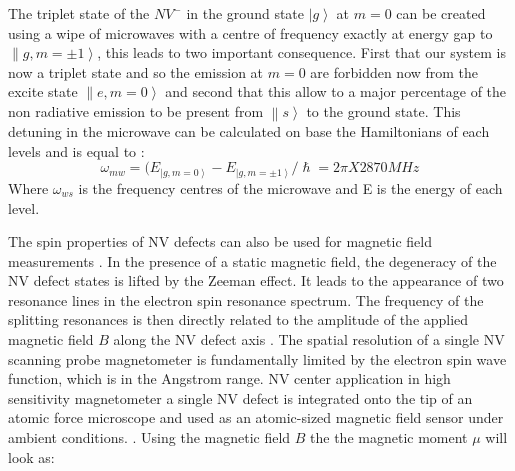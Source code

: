 The triplet state of the  $NV^{-}$ in the ground state $\left| g \right\rangle $ at $m=0$ can be created using a wipe of microwaves with a centre of frequency exactly at energy gap to $\left\| g,m=\pm1\right\rangle $, this leads to two important consequence. First that our system is now a triplet state and so the emission at $m=0$ are forbidden now from the excite state $\left\| e,m=0\right\rangle $ and second that this allow to a major percentage of the non radiative emission to be present from $\left\| s\right\rangle $ to the ground state. This detuning in the microwave can be calculated on base the Hamiltonians of each levels and is equal to \cite{schirhagl_nitrogen-vacancy_2014}:\\

\begin{equation}
\omega_{mw}=(E_{\left|g,m=0\right\rangle}-E_{\left|g,m=\pm 1\right\rangle}/ \hslash = 2π X 2870MHz 
\end{equation}
Where $\omega_{ws}$ is the frequency centres of the microwave and E is the energy of each level.

The spin properties of NV defects can also be used for magnetic field measurements \cite{sage_optical_2013}. In the presence of a static magnetic field, the degeneracy of the NV defect states is lifted by the Zeeman effect.  It leads to the appearance of two resonance lines in the electron spin resonance spectrum. The frequency of the splitting resonances is then directly related to the amplitude of the applied magnetic field $B$ along the NV defect axis  \cite{lesik_engineering_2015}. The spatial resolution of a single NV scanning probe magnetometer is fundamentally limited by the electron spin wave function, which is in the Angstrom range. NV center application in high sensitivity magnetometer a single NV defect is integrated onto the tip of an atomic force microscope and used as an atomic-sized magnetic ﬁeld sensor under ambient conditions. \cite{zhou_scanning_2017}.
Using the magnetic field $B$ the the magnetic moment $\mu$ will look as:\\

